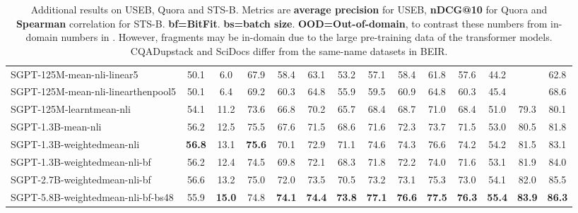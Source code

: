 \documentclass{article}
\begin{document}
\begin{table*}[!h]
{\begin{tabular}{@{}l|c|c|ccc|ccccc|c|c|c@{}}
    SGPT-125M-mean-nli-linear5
    & 50.1
    & 6.0
    & 67.9
    & 58.4
    & 63.1
    & 53.2
    & 57.1
    & 58.4
    & 61.8
    & 57.6
    & 44.2
    &
    & 62.8
    \\
    SGPT-125M-mean-nli-linearthenpool5
    & 50.1
    & 6.4
    & 69.2
    & 60.3
    & 64.8
    & 55.9
    & 59.5
    & 60.9
    & 64.8
    & 60.3
    & 45.4
    &
    & 68.6
    \\
    SGPT-125M-learntmean-nli
    & 54.1
    & 11.2
    & 73.6
    & 66.8
    & 70.2
    & 65.7
    & 68.4
    & 68.7
    & 71.0
    & 68.4
    & 51.0
    & 79.3
    & 80.1
    \\
    SGPT-1.3B-mean-nli
    & 56.2
    & 12.5
    & 75.5
    & 67.6
    & 71.5
    & 68.6
    & 71.6
    & 72.3
    & 73.7
    & 71.5
    & 53.0
    & 80.5
    & 81.8
    \\
    SGPT-1.3B-weightedmean-nli
    & \textbf{56.8}
    & 13.1
    & \textbf{75.6}
    & 70.1
    & 72.9
    & 71.1
    & 74.6
    & 74.3
    & 76.6
    & 74.2
    & 54.2
    & 81.5
    & 83.1
    \\
    SGPT-1.3B-weightedmean-nli-bf
    & 56.2
    & 12.4
    & 74.5
    & 69.8
    & 72.1
    & 68.3
    & 71.8
    & 72.2
    & 74.0
    & 71.6
    & 53.1
    & 81.9
    & 84.0
    \\
    SGPT-2.7B-weightedmean-nli-bf
    & 56.6
    & 13.2
    & 75.0
    & 72.0
    & 73.5
    & 70.5
    & 73.2
    & 73.1
    & 75.3
    & 73.0
    & 54.1
    & 82.0
    & 85.5
    \\
    SGPT-5.8B-weightedmean-nli-bf-bs48
    & 55.9
    & \textbf{15.0}
    & 74.8
    & \textbf{74.1}
    & \textbf{74.4}
    & \textbf{73.8}
    & \textbf{77.1}
    & \textbf{76.6}
    & \textbf{77.5}
    & \textbf{76.3}
    & \textbf{55.4}
    & \textbf{83.9}
    & \textbf{86.3}
    \\
    \bottomrule
    \end{tabular}}
\caption{Additional results on USEB, Quora and STS-B. Metrics are \textbf{average precision} for USEB, \textbf{nDCG@10} for Quora and \textbf{Spearman} correlation for STS-B. \textbf{bf=BitFit}. \textbf{bs=batch size}. \textbf{OOD=Out-of-domain}, to contrast these numbers from in-domain numbers in \cite{wang2021tsdae}. However, fragments may be in-domain due to the large pre-training data of the transformer models. CQADupstack and SciDocs differ from the same-name datasets in BEIR.}
    \label{tab:besymresextra}
\end{table*}
\end{document}
